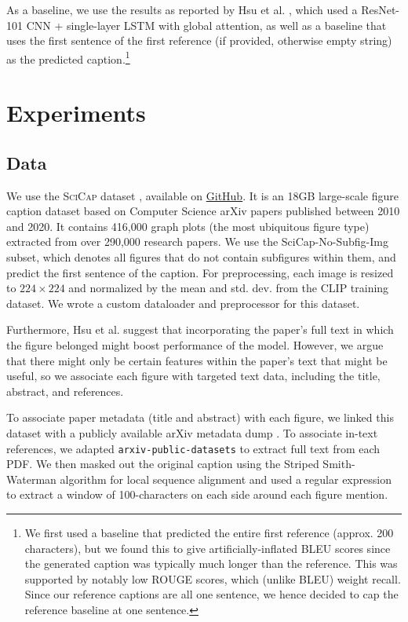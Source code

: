 \documentclass{article}
\newcommand{\scicap}{\textsc{SciCap}\xspace}
\begin{document}
As a baseline, we use the results as reported by Hsu et al. \citep{scicap}, which used a ResNet-101 CNN + single-layer LSTM with global attention, as well as a baseline that uses the first sentence of the first reference (if provided, otherwise empty string) as the predicted caption.\footnote{We first used a baseline that predicted the entire first reference (approx. 200 characters), but we found this to give artificially-inflated BLEU scores since the generated caption was typically much longer than the reference. This was supported by notably low ROUGE scores, which (unlike BLEU) weight recall. Since our reference captions are all one sentence, we hence decided to cap the reference baseline at one sentence.}

\section{Experiments}

\subsection{Data}
\label{sec:data}

We use the \scicap dataset \citep{scicap}, available on \href{https://github.com/tingyaohsu/SciCap}{GitHub}. It is an 18GB large-scale figure caption dataset based on Computer Science arXiv papers published between 2010 and 2020. It contains 416,000 graph plots (the most ubiquitous figure type) extracted from over 290,000 research papers. We use the SciCap-No-Subfig-Img subset, which denotes all figures that do not contain subfigures within them, and predict the first sentence of the caption. For preprocessing, each image is resized to $224 \times 224$ and normalized by the mean and std. dev. from the CLIP training dataset. We wrote a custom dataloader and preprocessor for this dataset.

Furthermore, Hsu et al. \citep{scicap} suggest that incorporating the paper's full text in which the figure belonged might boost performance of the model. However, we argue that there might only be certain features within the paper's text that might be useful, so we associate each figure with targeted text data, including the title, abstract, and references.

To associate paper metadata (title and abstract) with each figure, we linked this dataset with a publicly available arXiv metadata dump \citep{noauthor_arxiv_nodate}. To associate in-text references, we adapted \texttt{arxiv-public-datasets} \citep{clement2019arxiv} to extract full text from each PDF. We then masked out the original caption using the Striped Smith-Waterman algorithm for local sequence alignment and used a regular expression to extract a window of 100-characters on each side around each figure mention.
\end{document}
